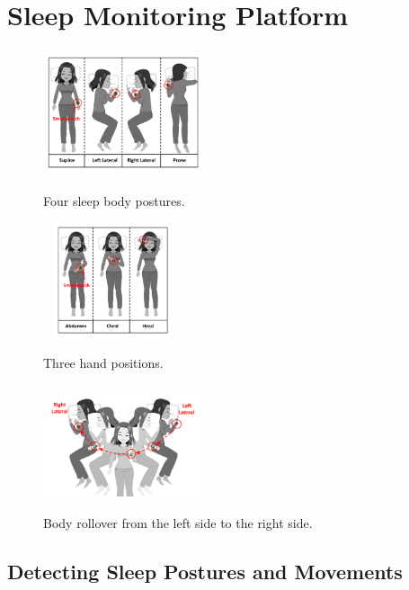 \section{\systemname Sleep Monitoring Platform}\label{Sec:3design}





\begin{figure}
	\centering
	\begin{minipage}[t]{.33\textwidth}
		\centering
		  \includegraphics[width=4.7cm,height=3.7cm]{Figures/BodyPosture.pdf}
		\caption{Four sleep body postures.}
		\label{fig:BodyPosture}
	\end{minipage}%
	\begin{minipage}[t]{.33\textwidth}
		\centering
		\includegraphics[width=4.1cm,height=3.4cm]{Figures/HandPosition.pdf}
		\caption{Three hand positions.}
		\label{fig:HandPosition}		
	\end{minipage}
\begin{minipage}[t]{.33\textwidth}
		\centering
	\includegraphics[width=4.7cm,height=3.7cm]{Figures/BodyRollover.pdf}
	\caption{Body rollover from the left side to the right side.}
	\label{fig:BodyRollover}
\end{minipage}
\end{figure}


\subsection{Detecting Sleep Postures and Movements}

